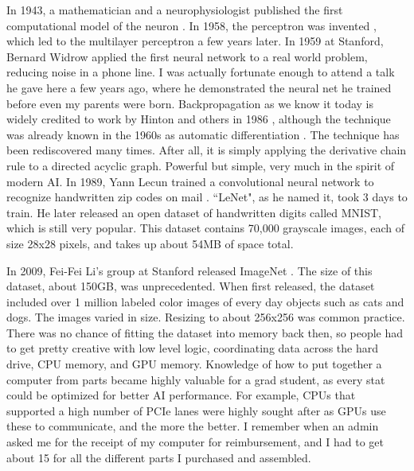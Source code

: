 In 1943, a mathematician and a neurophysiologist published the first computational model of the neuron \cite{mcculloch1943logical}.  In 1958, the perceptron was invented \cite{rosenblatt1958perceptron}, which led to the multilayer perceptron a few years later.  In 1959 at Stanford, Bernard Widrow applied the first neural network to a real world problem, reducing noise in a phone line.  I was actually fortunate enough to attend a talk he gave here a few years ago, where he demonstrated the neural net he trained before even my parents were born.  Backpropagation as we know it today is widely credited to work by Hinton and others in 1986 \cite{rumelhart1986learning}, although the technique was already known in the 1960s as automatic differentiation \cite{wengert1964simple}.  The technique has been rediscovered many times.  After all, it is simply applying the derivative chain rule to a directed acyclic graph.  Powerful but simple, very much in the spirit of modern AI.  In 1989, Yann Lecun trained a convolutional neural network to recognize handwritten zip codes on mail \cite{lecun1989backpropagation}. ``LeNet", as he named it, took 3 days to train.  He later released an open dataset of handwritten digits called MNIST, which is still very popular.  This dataset contains 70,000 grayscale images, each of size 28x28 pixels, and takes up about 54MB of space total. 

In 2009, Fei-Fei Li's group at Stanford released ImageNet \cite{deng2009imagenet}.  The size of this dataset, about 150GB, was unprecedented.  When first released, the dataset included over 1 million labeled color images of every day objects such as cats and dogs.  The images varied in size. Resizing to about 256x256 was common practice.  There was no chance of fitting the dataset into memory back then, so people had to get pretty creative with low level logic, coordinating data across the hard drive, CPU memory, and GPU memory.  Knowledge of how to put together a computer from parts became highly valuable for a grad student, as every stat could be optimized for better AI performance.  For example, CPUs that supported a high number of PCIe lanes were highly sought after as GPUs use these to communicate, and the more the better.  I remember when an admin asked me for the receipt of my computer for reimbursement, and I had to get about 15 for all the different parts I purchased and assembled.  

